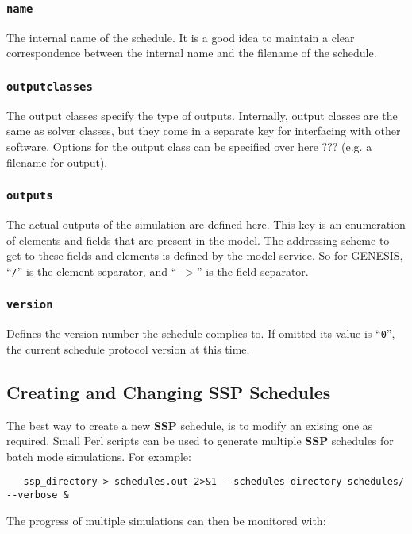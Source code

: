 \documentclass[12pt]{article}
\begin{document}
\subsubsection*{\tt name}

The internal name of the schedule. It is a good idea to maintain a clear correspondence between the internal name and the filename of the schedule. 

\subsubsection*{\tt outputclasses}

The output classes specify the type of outputs. Internally, output classes are the same as solver classes, but they come in a separate key for interfacing with other software. Options for the output class can be specified over here ??? (e.g. a filename for output). 

\subsubsection*{\tt outputs}

The actual outputs of the simulation are defined here. This key is an enumeration of elements and fields that are present in the model. The addressing scheme to get to these fields and elements is defined by the model service. So for GENESIS, ``{\tt /}'' is the element separator, and ``{\tt -$>$}'' is the field separator. 

\subsubsection*{\tt version}

Defines the version number the schedule complies to. If omitted its value is ``{\tt 0}'', the current schedule protocol version at this time. 

\subsection*{Creating and Changing SSP Schedules}

The best way to create a new {\bf SSP} schedule, is to modify an exising one as required. Small Perl scripts can be used to generate multiple {\bf SSP} schedules for batch mode simulations. For example:

\begin{verbatim}
   ssp_directory > schedules.out 2>&1 --schedules-directory schedules/ --verbose &
\end{verbatim}
The progress of multiple simulations can then be monitored with:
\end{document}
